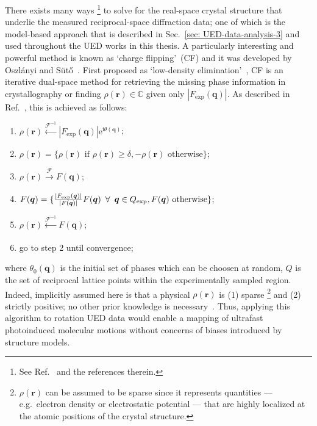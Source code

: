 There exists many ways%
\footnote{See Ref.~\cite{Palatinus2013b} and the references therein.}
to solve for the real-space crystal structure that underlie the measured reciprocal-space diffraction data;
one of which is the model-based approach that is described in Sec.~\ref{sec: UED-data-analysis-3}
and used throughout the UED works in this thesis.
%
A particularly interesting and powerful method is known as `charge flipping'~(CF)
and it was developed by Oszl\'{a}nyi and S\"{u}t\H{o}~\cite{Oszlanyi2004, Oszlanyi2005,
Oszlanyi2006, Oszlanyi2008, Oszlanyi2011}.
%
First proposed as `low-density elimination'~\cite{Shiono1992, Refaat1993},
CF is an iterative dual-space method for retrieving the missing phase information in crystallography
or finding $\rho(\boldsymbol{r}) \in \mathbb{C}$ given only $|F_\text{exp}(\boldsymbol{q})|$.
%
As described in Ref.~\cite{Palatinus2013b}, this is achieved as follows:
%
\begin{enumerate}
  \item $\rho(\boldsymbol{r}) \xleftarrow[]{\mathcal{F}^{-1}} |F_\text{exp}(\boldsymbol{q})|
    \mathrm{e}^{\mathrm{i} \theta(\boldsymbol{q})}$;
  \item $\rho(\boldsymbol{r}) = \{ \rho(\boldsymbol{r}) \text{ if } \rho(\boldsymbol{r}) \geq \delta,
    -\rho(\boldsymbol{r}) \text{ otherwise} \}$;
  \item $\rho(\boldsymbol{r}) \xrightarrow[]{\mathcal{F}} F(\boldsymbol{q})$;
  \item $F(\boldsymbol{q}) = \{\frac{|F_\text{exp}(\boldsymbol{q})|}{|F(\boldsymbol{q})|} F(\boldsymbol{q})
    \enskip \forall \enskip \boldsymbol{q} \in Q_\text{exp}, F(\boldsymbol{q}) \text{ otherwise} \}$;
  \item $\rho(\boldsymbol{r})\xleftarrow[]{\mathcal{F}^{-1}} F(\boldsymbol{q})$;
  \item go to step 2 until convergence;
\end{enumerate}
%
where $\theta_0(\boldsymbol{q})$ is the initial set of phases which can be choosen at random,
$Q$ is the set of reciprocal lattice points within the experimentally sampled region.
%
Indeed, implicitly assumed here is that a physical $\rho(\boldsymbol{r})$ is (1) sparse%
\footnote{$\rho(\boldsymbol{r})$ can be assumed to be sparse
since it represents quantities --- e.g.~electron density or electrostatic potential ---
that are highly localized at the atomic positions of the crystal structure.}
and (2) strictly positive; no other prior knowledge is necessary~\cite{Eggeman2009}.
%
Thus, applying this algorithm to rotation UED data would enable
a mapping of ultrafast photoinduced molecular motions
without concerns of biases introduced by structure models.

